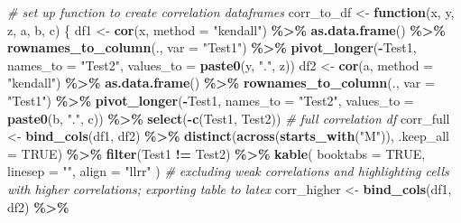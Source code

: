\documentclass[
]{article}
\newenvironment{Shaded}{\begin{snugshade}}{\end{snugshade}}
\newcommand{\AttributeTok}[1]{\textcolor[rgb]{0.13,0.29,0.53}{#1}}
\newcommand{\CommentTok}[1]{\textcolor[rgb]{0.56,0.35,0.01}{\textit{#1}}}
\newcommand{\ConstantTok}[1]{\textcolor[rgb]{0.56,0.35,0.01}{#1}}
\newcommand{\ControlFlowTok}[1]{\textcolor[rgb]{0.13,0.29,0.53}{\textbf{#1}}}
\newcommand{\FunctionTok}[1]{\textcolor[rgb]{0.13,0.29,0.53}{\textbf{#1}}}
\newcommand{\NormalTok}[1]{#1}
\newcommand{\OtherTok}[1]{\textcolor[rgb]{0.56,0.35,0.01}{#1}}
\newcommand{\SpecialCharTok}[1]{\textcolor[rgb]{0.81,0.36,0.00}{\textbf{#1}}}
\newcommand{\StringTok}[1]{\textcolor[rgb]{0.31,0.60,0.02}{#1}}
\begin{document}
\begin{Shaded}
\begin{Highlighting}[]
\CommentTok{\# set up function to create correlation dataframes}
\NormalTok{corr\_to\_df }\OtherTok{\textless{}{-}} \ControlFlowTok{function}\NormalTok{(x, y, z, a, b, c) \{}
\NormalTok{  df1 }\OtherTok{\textless{}{-}} \FunctionTok{cor}\NormalTok{(x, }\AttributeTok{method =} \StringTok{"kendall"}\NormalTok{) }\SpecialCharTok{\%\textgreater{}\%}
    \FunctionTok{as.data.frame}\NormalTok{() }\SpecialCharTok{\%\textgreater{}\%}
    \FunctionTok{rownames\_to\_column}\NormalTok{(., }\AttributeTok{var =} \StringTok{"Test1"}\NormalTok{) }\SpecialCharTok{\%\textgreater{}\%}
    \FunctionTok{pivot\_longer}\NormalTok{(}\SpecialCharTok{{-}}\NormalTok{Test1, }\AttributeTok{names\_to =} \StringTok{"Test2"}\NormalTok{, }\AttributeTok{values\_to =} \FunctionTok{paste0}\NormalTok{(y, }\StringTok{"."}\NormalTok{, z))}
\NormalTok{  df2 }\OtherTok{\textless{}{-}} \FunctionTok{cor}\NormalTok{(a, }\AttributeTok{method =} \StringTok{"kendall"}\NormalTok{) }\SpecialCharTok{\%\textgreater{}\%}
    \FunctionTok{as.data.frame}\NormalTok{() }\SpecialCharTok{\%\textgreater{}\%}
    \FunctionTok{rownames\_to\_column}\NormalTok{(., }\AttributeTok{var =} \StringTok{"Test1"}\NormalTok{) }\SpecialCharTok{\%\textgreater{}\%}
    \FunctionTok{pivot\_longer}\NormalTok{(}\SpecialCharTok{{-}}\NormalTok{Test1, }\AttributeTok{names\_to =} \StringTok{"Test2"}\NormalTok{, }\AttributeTok{values\_to =} \FunctionTok{paste0}\NormalTok{(b, }\StringTok{"."}\NormalTok{, c)) }\SpecialCharTok{\%\textgreater{}\%}
    \FunctionTok{select}\NormalTok{(}\SpecialCharTok{{-}}\FunctionTok{c}\NormalTok{(Test1, Test2))}
  \CommentTok{\# full correlation df}
\NormalTok{  corr\_full }\OtherTok{\textless{}{-}} \FunctionTok{bind\_cols}\NormalTok{(df1, df2) }\SpecialCharTok{\%\textgreater{}\%}
    \FunctionTok{distinct}\NormalTok{(}\FunctionTok{across}\NormalTok{(}\FunctionTok{starts\_with}\NormalTok{(}\StringTok{"M"}\NormalTok{)), }\AttributeTok{.keep\_all =} \ConstantTok{TRUE}\NormalTok{) }\SpecialCharTok{\%\textgreater{}\%}
    \FunctionTok{filter}\NormalTok{(Test1 }\SpecialCharTok{!=}\NormalTok{ Test2) }\SpecialCharTok{\%\textgreater{}\%}
    \FunctionTok{kable}\NormalTok{(}
      \AttributeTok{booktabs =} \ConstantTok{TRUE}\NormalTok{, }\AttributeTok{linesep =} \StringTok{""}\NormalTok{,}
      \AttributeTok{align =} \StringTok{"llrr"}
\NormalTok{    )}
  \CommentTok{\# excluding weak correlations and highlighting cells with higher correlations; exporting table to latex}
\NormalTok{  corr\_higher }\OtherTok{\textless{}{-}} \FunctionTok{bind\_cols}\NormalTok{(df1, df2) }\SpecialCharTok{\%\textgreater{}\%}

\end{Highlighting}
\end{Shaded}
\end{document}

